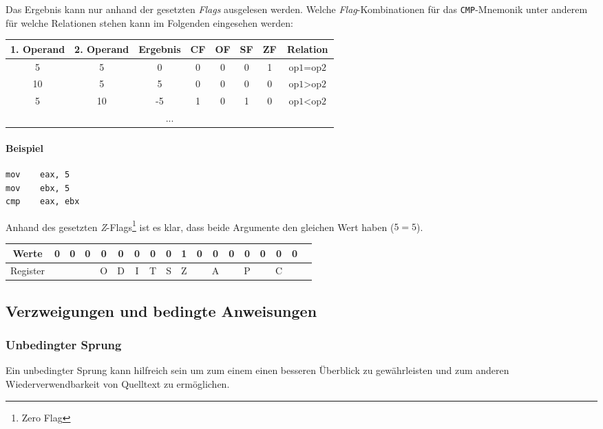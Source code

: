 Das Ergebnis kann nur anhand der gesetzten \textit{Flags} ausgelesen werden.
Welche \textit{Flag}-Kombinationen für das \texttt{CMP}-Mnemonik unter anderem für welche Relationen stehen kann im Folgenden eingesehen werden:

\begin{tabular}{|c|c|c|c|c|c|c|c|}
\hline
1. Operand & 2. Operand & Ergebnis &
CF &
OF &
SF &
ZF
& Relation \\ \hline
5          & 5          & 0        & 0  & 0  & 0  & 1  & $\text{op1} = \text{op2}$ \\ \hline
10         & 5          & 5        & 0  & 0  & 0  & 0  & $\text{op1} > \text{op2}$ \\ \hline
5          & 10         & -5       & 1  & 0  & 1  & 0  & $\text{op1} < \text{op2}$ \\ \hline
\multicolumn{8}{|c|}{...} \\ \hline
\end{tabular}

\paragraph{Beispiel\newline}
\makebox{}
\begin{lstlisting}
mov    eax, 5
mov    ebx, 5
cmp    eax, ebx
\end{lstlisting}

Anhand des gesetzten \textit{Z}-Flags\footnote{Zero Flag} ist es klar, dass beide Argumente den gleichen Wert haben ($5 = 5$).

\begin{tabular}{|c|c|c|c|c|c|c|c|c|c|c|c|c|c|c|c|c|c|}
\hline Werte & 0 & 0 & 0 & 0 & 0 & 0 & 0 & 0 & 1 & 0 & 0 & 0 & 0 & 0 & 0 & 0 \\
\hline Register & & & & O & D & I & T & S & Z & & A & & P & & C & \\
\hline
\end{tabular}

\subsection{Verzweigungen und bedingte Anweisungen}

\subsubsection{Unbedingter Sprung}
Ein unbedingter Sprung kann hilfreich sein um zum einem einen besseren Überblick zu gewährleisten und zum anderen Wiederverwendbarkeit von Quelltext zu ermöglichen.

